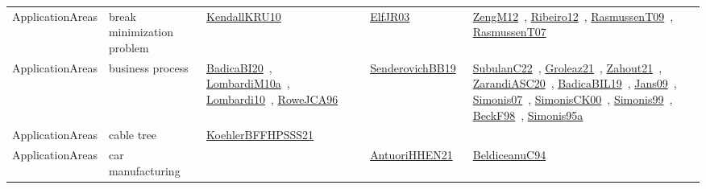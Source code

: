 {\begin{longtable}{lp{3cm}>{\raggedright\arraybackslash}p{6cm}>{\raggedright\arraybackslash}p{6cm}>{\raggedright\arraybackslash}p{8cm}}
\index{break minimization problem}\index{ApplicationAreas!break minimization problem}ApplicationAreas & break minimization problem & \href{../works/KendallKRU10.pdf}{KendallKRU10}~\cite{KendallKRU10} & \href{../works/ElfJR03.pdf}{ElfJR03}~\cite{ElfJR03} & \href{../works/ZengM12.pdf}{ZengM12}~\cite{ZengM12}, \href{../works/Ribeiro12.pdf}{Ribeiro12}~\cite{Ribeiro12}, \href{../works/RasmussenT09.pdf}{RasmussenT09}~\cite{RasmussenT09}, \href{../works/RasmussenT07.pdf}{RasmussenT07}~\cite{RasmussenT07}\\
\index{business process}\index{ApplicationAreas!business process}ApplicationAreas & business process & \href{../works/BadicaBI20.pdf}{BadicaBI20}~\cite{BadicaBI20}, \href{../works/LombardiM10a.pdf}{LombardiM10a}~\cite{LombardiM10a}, \href{../works/Lombardi10.pdf}{Lombardi10}~\cite{Lombardi10}, \href{../works/RoweJCA96.pdf}{RoweJCA96}~\cite{RoweJCA96} & \href{../works/SenderovichBB19.pdf}{SenderovichBB19}~\cite{SenderovichBB19} & \href{../works/SubulanC22.pdf}{SubulanC22}~\cite{SubulanC22}, \href{../works/Groleaz21.pdf}{Groleaz21}~\cite{Groleaz21}, \href{../works/Zahout21.pdf}{Zahout21}~\cite{Zahout21}, \href{../works/ZarandiASC20.pdf}{ZarandiASC20}~\cite{ZarandiASC20}, \href{../works/BadicaBIL19.pdf}{BadicaBIL19}~\cite{BadicaBIL19}, \href{../works/Jans09.pdf}{Jans09}~\cite{Jans09}, \href{../works/Simonis07.pdf}{Simonis07}~\cite{Simonis07}, \href{../works/SimonisCK00.pdf}{SimonisCK00}~\cite{SimonisCK00}, \href{../works/Simonis99.pdf}{Simonis99}~\cite{Simonis99}, \href{../works/BeckF98.pdf}{BeckF98}~\cite{BeckF98}, \href{../works/Simonis95a.pdf}{Simonis95a}~\cite{Simonis95a}\\
\index{cable tree}\index{ApplicationAreas!cable tree}ApplicationAreas & cable tree & \href{../works/KoehlerBFFHPSSS21.pdf}{KoehlerBFFHPSSS21}~\cite{KoehlerBFFHPSSS21} &  & \\
\index{car manufacturing}\index{ApplicationAreas!car manufacturing}ApplicationAreas & car manufacturing &  & \href{../works/AntuoriHHEN21.pdf}{AntuoriHHEN21}~\cite{AntuoriHHEN21} & \href{../works/BeldiceanuC94.pdf}{BeldiceanuC94}~\cite{BeldiceanuC94}\\

\end{longtable}}
